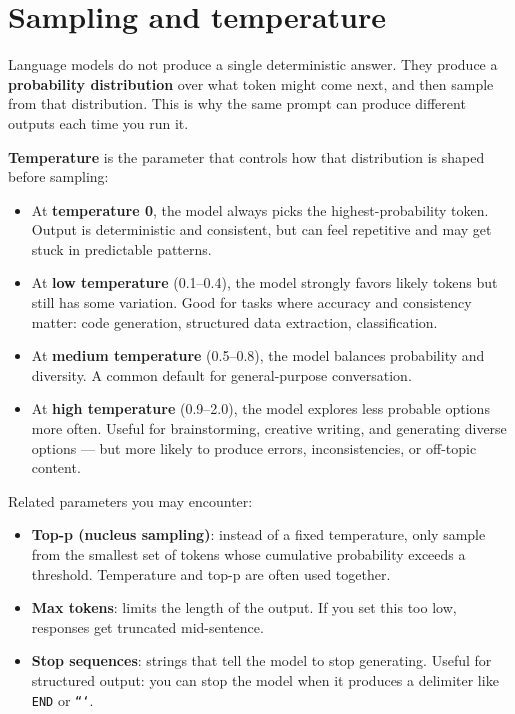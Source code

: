 
\section{Sampling and temperature}

Language models do not produce a single deterministic answer. They produce a \textbf{probability distribution} over what token might come next, and then sample from that distribution. This is why the same prompt can produce different outputs each time you run it.

\textbf{Temperature} is the parameter that controls how that distribution is shaped before sampling:

\begin{itemize}[noitemsep,topsep=0pt]
  \item At \textbf{temperature 0}, the model always picks the highest-probability token. Output is deterministic and consistent, but can feel repetitive and may get stuck in predictable patterns.
  \item At \textbf{low temperature} (0.1--0.4), the model strongly favors likely tokens but still has some variation. Good for tasks where accuracy and consistency matter: code generation, structured data extraction, classification.
  \item At \textbf{medium temperature} (0.5--0.8), the model balances probability and diversity. A common default for general-purpose conversation.
  \item At \textbf{high temperature} (0.9--2.0), the model explores less probable options more often. Useful for brainstorming, creative writing, and generating diverse options --- but more likely to produce errors, inconsistencies, or off-topic content.
\end{itemize}

Related parameters you may encounter:

\begin{itemize}[noitemsep,topsep=0pt]
  \item \textbf{Top-p (nucleus sampling)}: instead of a fixed temperature, only sample from the smallest set of tokens whose cumulative probability exceeds a threshold. Temperature and top-p are often used together.
  \item \textbf{Max tokens}: limits the length of the output. If you set this too low, responses get truncated mid-sentence.
  \item \textbf{Stop sequences}: strings that tell the model to stop generating. Useful for structured output: you can stop the model when it produces a delimiter like \texttt{END} or \texttt{```}.
\end{itemize}

